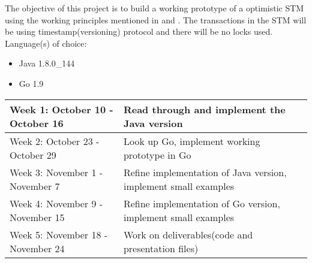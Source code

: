 \documentclass{article}
\begin{document}
    \begin{flushleft}
      {
        The objective of this project is to build a working prototype of a optimistic STM using the working principles mentioned in \cite{Shavit1997} and \cite{MichaelW1}. The transactions in the STM will be using timestamp(versioning) protocol and there will be no locks used.
        \newline
        \newline
        Language(s) of choice:
        \begin{itemize}
          \item Java 1.8.0\_144
          \item Go 1.9
        \end{itemize}
      }
    \end{flushleft}
    {
      \newcommand{\schedule}[2]{
        \hline
        #1 & #2
        \\
        \hline
      }

      \begin{center}
        \begin{table}[!th]
          \begin{tabular}{|L|L|}
            \schedule{Week 1: October 10 - October 16}{Read through \cite{Shavit1997} and implement the Java version}
            \schedule{Week 2: October 23 - October 29}{Look up Go, implement working prototype in Go}
            \schedule{Week 3: November 1 - November 7}{Refine implementation of Java version, implement small examples}
            \schedule{Week 4: November 9 - November 15}{Refine implementation of Go version, implement small examples}
            \schedule{Week 5: November 18 - November 24}{Work on deliverables(code and presentation files)}
          \end{tabular}
        \end{table}  
      \end{center}
    }

    \nocite{SJonesBeautifulConcc}
    {}
    
\end{document}
